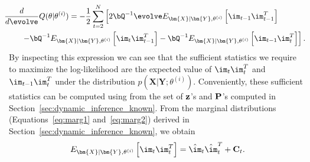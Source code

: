 \begin{align}
& \hspace{-.1in}  \frac{d}{d \evolve} Q(\theta|\theta^{(i)}) %
=   -\frac{1}{2} \sum_{t=2}^{N} \left[ 2 \bQ^{-1} \evolve  E_{ \bm{X}| \bm{Y}, \theta^{(i)} } \left[ \im_{t-1}   \im_{t-1}^T\right]   \right. \\
\notag & \hspace{0.2in} \left. - \bQ^{-1} E_{ \bm{X}| \bm{Y}, \theta^{(i)} }  \left[ \im_t \im_{t-1}^T \right] -  \bQ^{-1} E_{ \bm{X}| \bm{Y}, \theta^{(i)} } \left[ \im_{t-1} \im_t^T \right]   \right].
\end{align}
By inspecting this expression we can see that the sufficient statistics we require to maximize the log-likelihood are the expected value of $\im_t \im_t^T$ and $\im_{t-1} \im_t^T$ under the distribution $p(\bm{X} | \bm{Y}; \theta^{(i)} ) $. Conveniently, these sufficient statistics can be computed using from the set of ${\bf z}$'s and $\bf{P}$'s computed in Section~\ref{sec:dynamic_inference_known}.  From the marginal distributions (Equations~\ref{eq:marg1} and~\ref{eq:marg2}) derived in Section~\ref{sec:dynamic_inference_known}, we obtain
\begin{align}
E_{ \bm{X}| \bm{Y}, \theta^{(i)} } \left[ \im_{t}   \im_{t}^T\right] = \hat{\im}_t  \hat{\im}_t ^T + {\bf C}_{t}.
\end{align}
